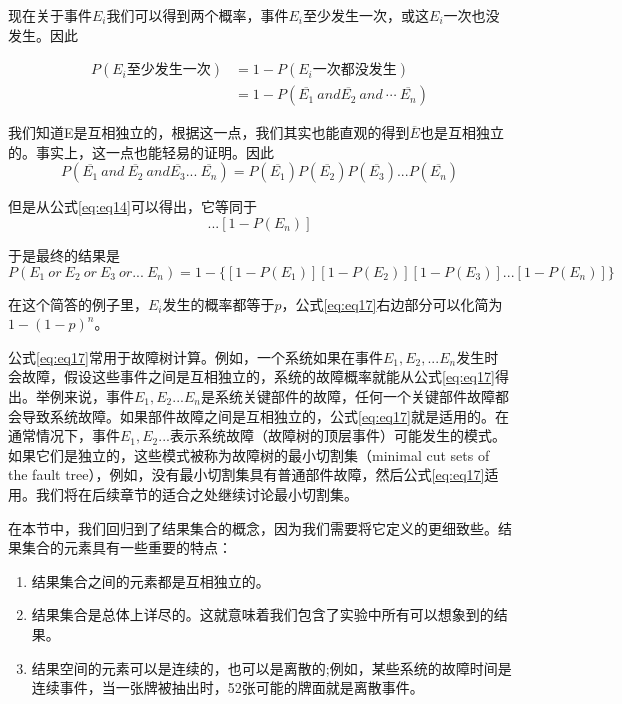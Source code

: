 \documentclass[cn,11pt,chinese]{elegantbook}
\begin{document}
现在关于事件$E_i$我们可以得到两个概率，事件$E_i$至少发生一次，或这$E_i$一次也没发生。因此

\begin{align*}
P(E_i\mbox{至少发生一次}) &=1-P(E_i\mbox{一次都没发生}) \\
&=1-P(\overline{E_1} \ and \overline{E_2} \ and \ \cdots \ \overline{E_n})
\end{align*}

我们知道E是互相独立的，根据这一点，我们其实也能直观的得到$\overline{E}$也是互相独立的。事实上，这一点也能轻易的证明。因此
\begin{equation}
P(\overline{E_1} \ and \ \overline{E_2} \ and \overline{E_3} ... \ \overline{E_n})=P(\overline{E_1})P(\overline{E_2})P(\overline{E_3})...P(\overline{E_n}) \label{eq:eq15}
\end{equation}

但是从公式\ref{eq:eq14}可以得出，它等同于
\begin{equation}
[1-P(E_1)][1-P(E_2)]...[1-P(E_n)]  
\end{equation}

于是最终的结果是
\begin{equation}\label{eq:eq17}
P(E_1 \ or \  E_2 \ or \ E_3 \ or ... \ E_n) = 1-\{[1-P(E_1)][1-P(E_2)][1-P(E_3)]...[1-P(E_n)]\} 
\end{equation}

在这个简答的例子里，$E_i$发生的概率都等于$p$，公式\ref{eq:eq17}右边部分可以化简为$1-(1-p)^n$。

公式\ref{eq:eq17}常用于故障树计算。例如，一个系统如果在事件$E_1,E_2,...E_n$发生时会故障，假设这些事件之间是互相独立的，系统的故障概率就能从公式\ref{eq:eq17}得出。举例来说，事件$E_1,E_2...E_n$是系统关键部件的故障，任何一个关键部件故障都会导致系统故障。如果部件故障之间是互相独立的，公式\ref{eq:eq17}就是适用的。在通常情况下，事件$E_1,E_2...$表示系统故障（故障树的顶层事件）可能发生的模式。如果它们是独立的，这些模式被称为故障树的最小切割集（minimal cut sets of the fault tree），例如，没有最小切割集具有普通部件故障，然后公式\ref{eq:eq17}适用。我们将在后续章节的适合之处继续讨论最小切割集。

在本节中，我们回归到了结果集合的概念，因为我们需要将它定义的更细致些。结果集合的元素具有一些重要的特点：

\begin{enumerate}
\item 结果集合之间的元素都是互相独立的。
\item 结果集合是总体上详尽的。这就意味着我们包含了实验中所有可以想象到的结果。
\item 结果空间的元素可以是连续的，也可以是离散的;例如，某些系统的故障时间是连续事件，当一张牌被抽出时，52张可能的牌面就是离散事件。
\end{enumerate}
\end{document}
